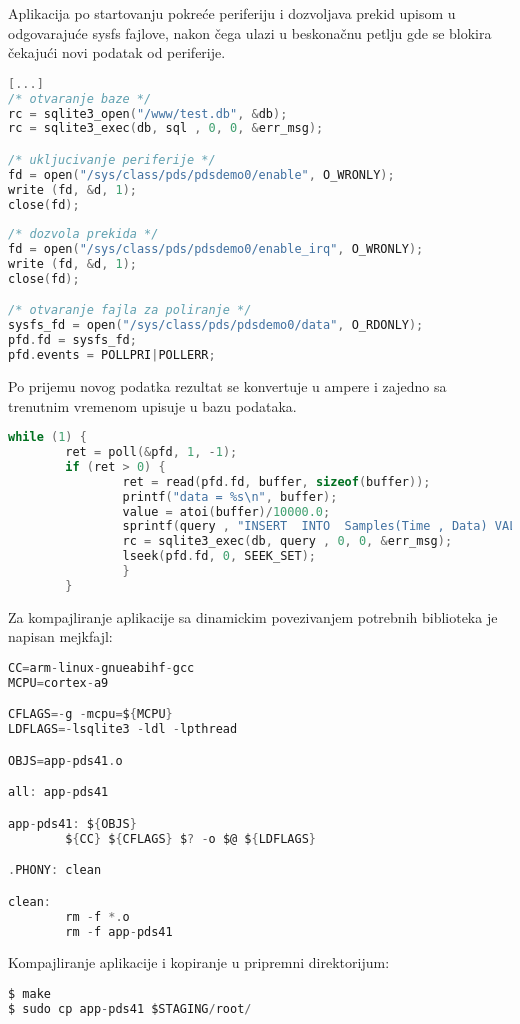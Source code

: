 \documentclass[12pt, a4paper]{article}
\begin{document}
Aplikacija po startovanju pokreće periferiju i dozvoljava
prekid upisom u odgovarajuće sysfs fajlove, nakon čega ulazi u
beskonačnu petlju gde se blokira čekajući novi podatak od periferije. 
\begin{lstlisting}[language=C]
[...]
/* otvaranje baze */
rc = sqlite3_open("/www/test.db", &db);
rc = sqlite3_exec(db, sql , 0, 0, &err_msg);

/* ukljucivanje periferije */
fd = open("/sys/class/pds/pdsdemo0/enable", O_WRONLY);
write (fd, &d, 1);
close(fd);
        
/* dozvola prekida */
fd = open("/sys/class/pds/pdsdemo0/enable_irq", O_WRONLY);
write (fd, &d, 1);
close(fd);

/* otvaranje fajla za poliranje */
sysfs_fd = open("/sys/class/pds/pdsdemo0/data", O_RDONLY);
pfd.fd = sysfs_fd;
pfd.events = POLLPRI|POLLERR;
\end{lstlisting}
Po prijemu novog podatka rezultat se konvertuje u ampere i zajedno sa trenutnim vremenom upisuje u bazu podataka.
\begin{lstlisting}[language=C]
while (1) {
        ret = poll(&pfd, 1, -1);
        if (ret > 0) {
                ret = read(pfd.fd, buffer, sizeof(buffer));
                printf("data = %s\n", buffer);
                value = atoi(buffer)/10000.0;
                sprintf(query , "INSERT  INTO  Samples(Time , Data) VALUES  (%u,%f);", (unsigned)time(NULL), value);
                rc = sqlite3_exec(db, query , 0, 0, &err_msg);
                lseek(pfd.fd, 0, SEEK_SET);
                }
        }
\end{lstlisting}
Za kompajliranje aplikacije sa dinamickim povezivanjem potrebnih biblioteka je napisan mejkfajl:
\begin{lstlisting}[language=C]
CC=arm-linux-gnueabihf-gcc
MCPU=cortex-a9

CFLAGS=-g -mcpu=${MCPU}
LDFLAGS=-lsqlite3 -ldl -lpthread

OBJS=app-pds41.o

all: app-pds41

app-pds41: ${OBJS}
        ${CC} ${CFLAGS} $? -o $@ ${LDFLAGS}

.PHONY: clean

clean:
        rm -f *.o
        rm -f app-pds41
\end{lstlisting}

Kompajliranje aplikacije i kopiranje u pripremni direktorijum:
\begin{lstlisting}[language=C]
$ make
$ sudo cp app-pds41 $STAGING/root/
\end{lstlisting}
\end{document}
